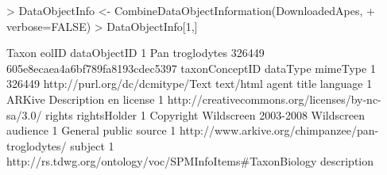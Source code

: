 \documentclass[12pt]{article}
\begin{document}
\begin{Schunk}
\begin{Sinput}
> DataObjectInfo <- CombineDataObjectInformation(DownloadedApes, 
+ 	verbose=FALSE)
> DataObjectInfo[1,]
\end{Sinput}
\begin{Soutput}
            Taxon  eolID                     dataObjectID
1 Pan troglodytes 326449 605e8ecaea4a6bf789fa8193cdec5397
  taxonConceptID                         dataType  mimeType
1         326449 http://purl.org/dc/dcmitype/Text text/html
   agent       title language
1 ARKive Description       en
                                            license
1 http://creativecommons.org/licenses/by-nc-sa/3.0/
                          rights rightsHolder
1 Copyright Wildscreen 2003-2008   Wildscreen
        audience
1 General public
                                             source
1 http://www.arkive.org/chimpanzee/pan-troglodytes/
                                                    subject
1 http://rs.tdwg.org/ontology/voc/SPMInfoItems#TaxonBiology
                                                                                                                                                                                                                                                                                                                                                                                                                                                                                                                                                                                                                                                                                                                                                                                                                                                                                                                                                                                                                                                                                                                                                                                                    description

\end{Soutput}
\end{Schunk}
\end{document}
